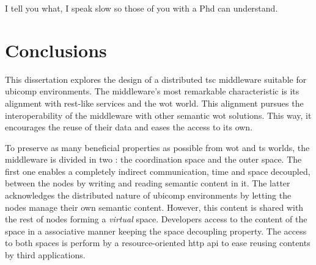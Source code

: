 

\begin{savequote}[50mm]
I tell you what, I speak slow so those of you with a Phd can understand.
\end{savequote}


\chapter{Conclusions}
\label{cha:conclusions}
\newcommand{\pathchapseven}{7_conclusion}


\ifpdf
    \graphicspath{{\pathchapseven/figures/PNG/}{\pathchapseven/figures/PDF/}{\pathchapseven/figures/}}
\else
    \graphicspath{{\pathchapseven/figures/EPS/}{\pathchapseven/figures/}}
\fi




This dissertation explores the design of a distributed \ac{tsc} middleware suitable for \ac{ubicomp} environments.
The middleware's most remarkable characteristic is its alignment with \ac{rest}-like services and the \ac{wot} world.
This alignment pursues the interoperability of the middleware with other semantic \ac{wot} solutions.
This way, it encourages the reuse of their data and eases the access to its own.


To preserve as many beneficial properties as possible from \ac{wot} and \ac{ts} worlds, the middleware is divided in two \Spaces{}: the coordination space and the outer space. %
The first one enables a completely indirect communication, time and space decoupled, between the nodes by writing and reading semantic content in it.
The latter acknowledges the distributed nature of \ac{ubicomp} environments by letting the nodes manage their own semantic content.
However, this content is shared with the rest of nodes forming a \emph{virtual} space.
Developers access to the content of the space in a associative manner keeping the space decoupling property.
The access to both spaces is perform by a resource-oriented \ac{http} \ac{api} to ease reusing contents by third applications. %


